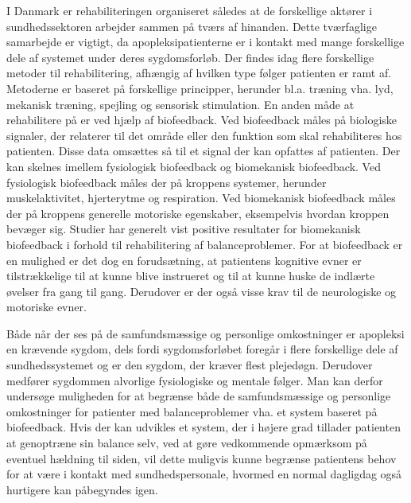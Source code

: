 I Danmark er rehabiliteringen organiseret således at de forskellige aktører i sundhedssektoren arbejder sammen på tværs af hinanden. Dette tværfaglige samarbejde er vigtigt, da apopleksipatienterne er i kontakt med mange forskellige dele af systemet under deres sygdomsforløb. 
Der findes idag flere forskellige metoder til rehabilitering, afhængig af hvilken type følger patienten er ramt af. Metoderne er baseret på forskellige principper, herunder bl.a. træning vha. lyd, mekanisk træning, spejling og sensorisk stimulation.
En anden måde at rehabilitere på er ved hjælp af biofeedback. Ved biofeedback måles på biologiske signaler, der relaterer til det område eller den funktion som skal rehabiliteres hos patienten. Disse data omsættes så til et signal der kan opfattes af patienten. Der kan skelnes imellem fysiologisk biofeedback og biomekanisk biofeedback. Ved fysiologisk biofeedback måles der på kroppens systemer, herunder muskelaktivitet, hjerterytme og respiration. Ved biomekanisk biofeedback måles der på kroppens generelle motoriske egenskaber, eksempelvis hvordan kroppen bevæger sig. Studier har generelt vist positive resultater for biomekanisk biofeedback i forhold til rehabilitering af balanceproblemer.
For at biofeedback er en mulighed er det dog en forudsætning, at patientens kognitive evner er tilstrækkelige til at kunne blive instrueret og til at kunne huske de indlærte øvelser fra gang til gang. Derudover er der også visse krav til de neurologiske og motoriske evner. 

Både når der ses på de samfundsmæssige og personlige omkostninger er apopleksi en krævende sygdom, dels fordi sygdomsforløbet foregår i flere forskellige dele af sundhedssystemet og er den sygdom, der kræver flest plejedøgn. Derudover medfører sygdommen alvorlige fysiologiske og mentale følger. 
Man kan derfor undersøge muligheden for at begrænse både de samfundsmæssige og personlige omkostninger for patienter med balanceproblemer vha. et system baseret på biofeedback. Hvis der kan udvikles et system, der i højere grad tillader patienten at genoptræne sin balance selv, ved at gøre vedkommende opmærksom på eventuel hældning til siden, vil dette muligvis kunne begrænse patientens behov for at være i kontakt med sundhedspersonale, hvormed en normal dagligdag også hurtigere kan påbegyndes igen.  